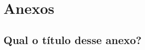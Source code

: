 \documentclass[pdftex,12pt,oneside,a4paper,english,french,spanish,brazil]{abntex2}
\begin{document}
\begin{sloppypar}

                
            \part*{Anexos}
            \begin{anexosenv}

                \chapter{Qual o título desse anexo?}\label{anex:anex01}
                

            \end{anexosenv}
          
            \printindex

    \end{sloppypar}
\end{document}
